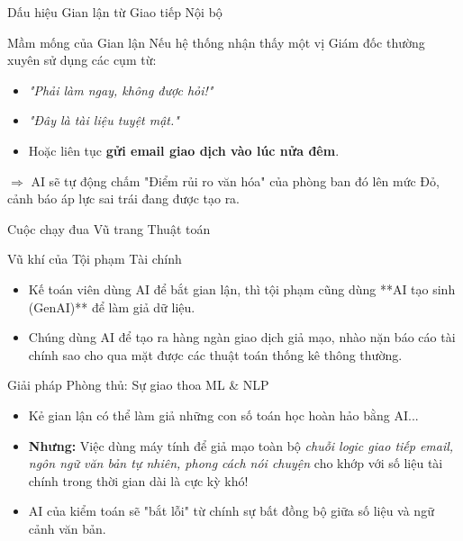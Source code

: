 \documentclass[aspectratio=169]{beamer}
\begin{document}
\begin{frame}{Dấu hiệu Gian lận từ Giao tiếp Nội bộ}
    \begin{exampleblock}{Mầm mống của Gian lận}
        Nếu hệ thống nhận thấy một vị Giám đốc thường xuyên sử dụng các cụm từ:
        \begin{itemize}
            \item \textit{"Phải làm ngay, không được hỏi!"}
            \item \textit{"Đây là tài liệu tuyệt mật."}
            \item Hoặc liên tục \textbf{gửi email giao dịch vào lúc nửa đêm}.
        \end{itemize}
    \end{exampleblock}
    $\Rightarrow$ AI sẽ tự động chấm "Điểm rủi ro văn hóa" của phòng ban đó lên mức Đỏ, cảnh báo áp lực sai trái đang được tạo ra.
\end{frame}

\begin{frame}{Cuộc chạy đua Vũ trang Thuật toán}
    \begin{alertblock}{Vũ khí của Tội phạm Tài chính}
        \begin{itemize}
            \item Kế toán viên dùng AI để bắt gian lận, thì tội phạm cũng dùng **AI tạo sinh (GenAI)** để làm giả dữ liệu.
            \item Chúng dùng AI để tạo ra hàng ngàn giao dịch giả mạo, nhào nặn báo cáo tài chính sao cho qua mặt được các thuật toán thống kê thông thường.
        \end{itemize}
    \end{alertblock}
\end{frame}

\begin{frame}{Giải pháp Phòng thủ: Sự giao thoa ML \& NLP}
    \begin{itemize}
        \item Kẻ gian lận có thể làm giả những con số toán học hoàn hảo bằng AI...
        \item \textbf{Nhưng:} Việc dùng máy tính để giả mạo toàn bộ \textit{chuỗi logic giao tiếp email, ngôn ngữ văn bản tự nhiên, phong cách nói chuyện} cho khớp với số liệu tài chính trong thời gian dài là cực kỳ khó!
        \item AI của kiểm toán sẽ "bắt lỗi" từ chính sự bất đồng bộ giữa số liệu và ngữ cảnh văn bản.
    \end{itemize}
\end{frame}
\end{document}
